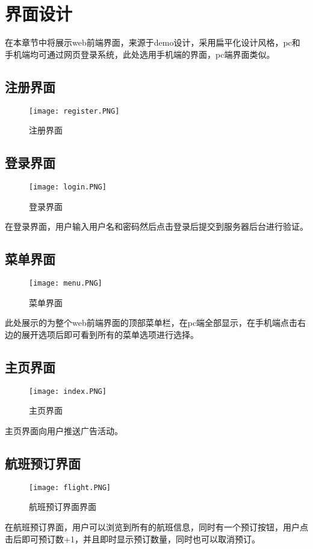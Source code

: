 \chapter{界面设计}
在本章节中将展示web前端界面，来源于demo设计，采用扁平化设计风格，pc和手机端均可通过网页登录系统，此处选用手机端的界面，pc端界面类似。
\section{注册界面}
\begin{figure}[H]
	\centering
	\texttt{[image: register.PNG]}
	\caption{注册界面} 
	\label{fig:figure1}
\end{figure}


\section{登录界面}
\begin{figure}[H]
	\centering
	\texttt{[image: login.PNG]}
	\caption{登录界面} 
	\label{fig:figure2}
\end{figure}
在登录界面，用户输入用户名和密码然后点击登录后提交到服务器后台进行验证。

\section{菜单界面}
\begin{figure}[H]
	\centering
	\texttt{[image: menu.PNG]}
	\caption{菜单界面} 
	\label{fig:figure3}
\end{figure}
此处展示的为整个web前端界面的顶部菜单栏，在pc端全部显示，在手机端点击右边的展开选项后即可看到所有的菜单选项进行选择。


\section{主页界面}
\begin{figure}[H]
	\centering
	\texttt{[image: index.PNG]}
	\caption{主页界面} 
	\label{fig:figure4}
\end{figure}
主页界面向用户推送广告活动。


\section{航班预订界面}
\begin{figure}[H]
	\centering
	\texttt{[image: flight.PNG]}
	\caption{航班预订界面界面} 
	\label{fig:figure5}
\end{figure}
在航班预订界面，用户可以浏览到所有的航班信息，同时有一个预订按钮，用户点击后即可预订数+1，并且即时显示预订数量，同时也可以取消预订。


